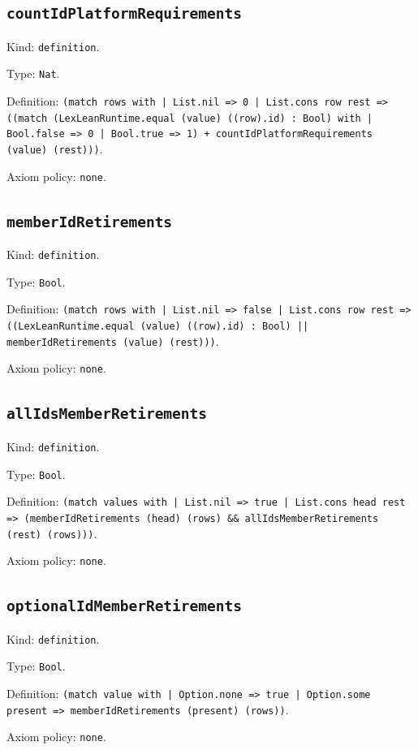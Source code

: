 \documentclass[11pt]{article}
\begin{document}
\subsection*{\texttt{countIdPlatformRequirements}}
\noindent Kind: \texttt{definition}.\par
\noindent Type: \texttt{Nat}.\par
\noindent Definition: \texttt{(match rows with | List.nil => 0 | List.cons row rest => ((match (LexLeanRuntime.equal (value) ((row).id) : Bool) with | Bool.false => 0 | Bool.true => 1) + countIdPlatformRequirements (value) (rest)))}.\par
\noindent Axiom policy: \texttt{none}.\par
\subsection*{\texttt{memberIdRetirements}}
\noindent Kind: \texttt{definition}.\par
\noindent Type: \texttt{Bool}.\par
\noindent Definition: \texttt{(match rows with | List.nil => false | List.cons row rest => ((LexLeanRuntime.equal (value) ((row).id) : Bool) || memberIdRetirements (value) (rest)))}.\par
\noindent Axiom policy: \texttt{none}.\par
\subsection*{\texttt{allIdsMemberRetirements}}
\noindent Kind: \texttt{definition}.\par
\noindent Type: \texttt{Bool}.\par
\noindent Definition: \texttt{(match values with | List.nil => true | List.cons head rest => (memberIdRetirements (head) (rows) \&\& allIdsMemberRetirements (rest) (rows)))}.\par
\noindent Axiom policy: \texttt{none}.\par
\subsection*{\texttt{optionalIdMemberRetirements}}
\noindent Kind: \texttt{definition}.\par
\noindent Type: \texttt{Bool}.\par
\noindent Definition: \texttt{(match value with | Option.none => true | Option.some present => memberIdRetirements (present) (rows))}.\par
\noindent Axiom policy: \texttt{none}.\par
\end{document}
